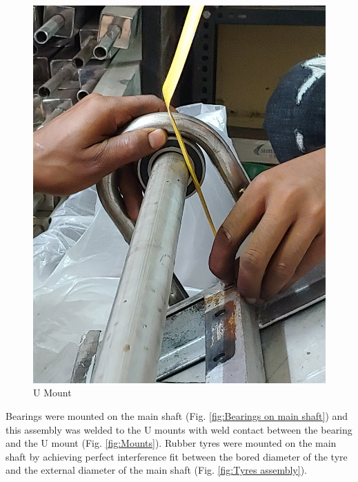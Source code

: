 \begin{figure}[H]
\begin{minipage}{0.37\textwidth}
      \includegraphics[width=1\textwidth]{U Mount.jpg}
      \caption{U Mount}
      \label{fig:U Mount}
    \end{minipage}
\end{figure}


Bearings were mounted on the main shaft (Fig. \ref{fig:Bearings on main shaft}) and this assembly was welded to the U mounts with weld contact between the bearing and the U mount (Fig. \ref{fig:Mounts}). Rubber tyres were mounted on the main shaft by achieving perfect interference fit between the bored diameter of the tyre and the external diameter of the main shaft (Fig. \ref{fig:Tyres assembly}).

